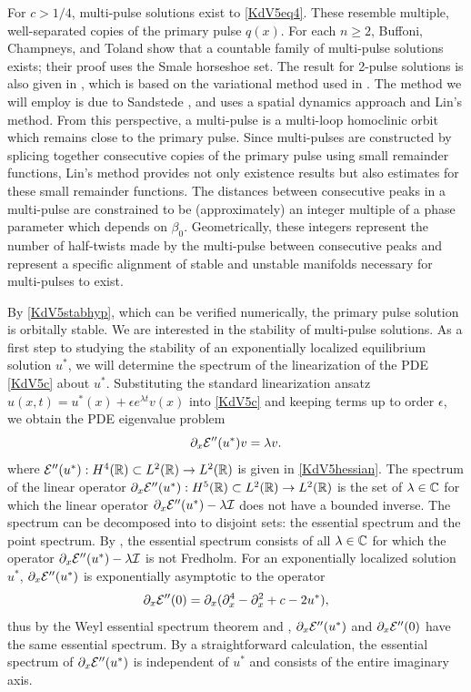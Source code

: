 \documentclass[11pt,reqno]{amsart}
\theoremstyle{plain}
\theoremstyle{definition}
\theoremstyle{remark}
\begin{document}
For $c > 1/4$, multi-pulse solutions exist to \cref{KdV5eq4}. These resemble multiple, well-separated copies of the primary pulse $q(x)$. For each $n \geq 2$, Buffoni, Champneys, and Toland \cite{Buffoni1996} show that a countable family of multi-pulse solutions exists; their proof uses the Smale horseshoe set. The result for 2-pulse solutions is also given in \cite[Theorem 2.2]{Pelinovsky2007}, which is based on the variational method used in \cite{Buffoni1996}. The method we will employ is due to Sandstede \cite{Sandstede1993, SandstedeStrut}, and uses a spatial dynamics approach and Lin's method. From this perspective, a multi-pulse is a multi-loop homoclinic orbit which remains close to the primary pulse. Since multi-pulses are constructed by splicing together consecutive copies of the primary pulse using small remainder functions, Lin's method provides not only existence results but also estimates for these small remainder functions. The distances between consecutive peaks in a multi-pulse are constrained to be (approximately) an integer multiple of a phase parameter which depends on $\beta_0$. Geometrically, these integers represent the number of half-twists made by the multi-pulse between consecutive peaks and represent a specific alignment of stable and unstable manifolds necessary for multi-pulses to exist. 

By \cref{KdV5stabhyp}, which can be verified numerically, the primary pulse solution is orbitally stable. We are interested in the stability of multi-pulse solutions. As a first step to studying the stability of an exponentially localized equilibrium solution $u^*$, we will determine the spectrum of the linearization of the PDE \eqref{KdV5c} about $u^*$. Substituting the standard linearization ansatz $u(x, t) = u^*(x) + \epsilon e^{\lambda t} v(x)$ into \eqref{KdV5c} and keeping terms up to order $\epsilon$, we obtain the PDE eigenvalue problem
\begin{equation}\label{KdV5PDEevp}
\partial_x \mathcal{E}''(u^*) v = \lambda v.
\end{equation}
where $\mathcal{E}''(u^*): H^4(\mathbb{R}) \subset L^2(\mathbb{R}) \rightarrow L^2(\mathbb{R})$ is given in \cref{KdV5hessian}. The spectrum of the linear operator $\partial_x \mathcal{E}''(u^*): H^5(\mathbb{R}) \subset L^2(\mathbb{R}) \rightarrow L^2(\mathbb{R})$ is the set of $\lambda \in \mathbb{C}$ for which the linear operator $\partial_x \mathcal{E}''(u^*) - \lambda \mathcal{I}$ does not have a bounded inverse. The spectrum can be decomposed into to disjoint sets: the essential spectrum and the point spectrum. By \cite[Theorem 3.1.11]{Kapitula2013}, the essential spectrum consists of all $\lambda \in \mathbb{C}$ for which the operator $\partial_x \mathcal{E}''(u^*) - \lambda \mathcal{I}$ is not Fredholm. For an exponentially localized solution $u^*$, $\partial_x \mathcal{E}''(u^*)$ is exponentially asymptotic to the operator 
\[
\partial_x \mathcal{E}''(0) = \partial_x(\partial_x^4 - \partial_x^2 + c - 2 u^*),
\]
thus by the Weyl essential spectrum theorem \cite[Theorem 2.2.6]{Kapitula2013} and \cite[Theorem 3.1.11]{Kapitula2013}, $\partial_x \mathcal{E}''(u^*)$ and $\partial_x \mathcal{E}''(0)$ have the same essential spectrum. By a straightforward calculation, the essential spectrum of $\partial_x \mathcal{E}''(u^*)$ is independent of $u^*$ and consists of the entire imaginary axis.
\end{document}

